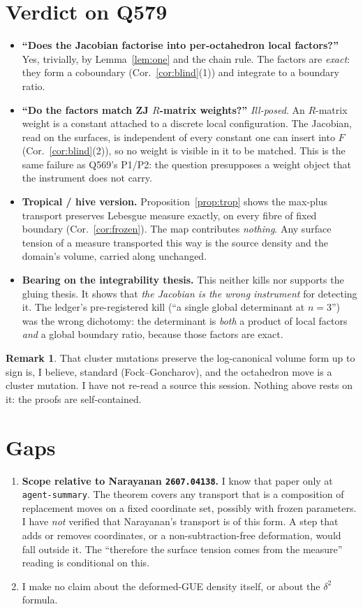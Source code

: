 \documentclass[11pt]{article}
\theoremstyle{definition}
\newtheorem{remark}[theorem]{Remark}
\begin{document}
\section{Verdict on Q579}
\begin{itemize}
\item \textbf{``Does the Jacobian factorise into per-octahedron local factors?''} Yes, trivially, by
Lemma~\ref{lem:one} and the chain rule. The factors are \emph{exact}: they form a coboundary
(Cor.~\ref{cor:blind}(1)) and integrate to a boundary ratio.
\item \textbf{``Do the factors match ZJ $R$-matrix weights?''} \emph{Ill-posed}. An $R$-matrix
weight is a constant attached to a discrete local configuration. The Jacobian, read on the
surfaces, is independent of every constant one can insert into $F$ (Cor.~\ref{cor:blind}(2)), so
no weight is visible in it to be matched. This is the same failure as Q569's P1/P2: the question
presupposes a weight object that the instrument does not carry.
\item \textbf{Tropical / hive version.} Proposition~\ref{prop:trop} shows the max-plus transport
preserves Lebesgue measure exactly, on every fibre of fixed boundary (Cor.~\ref{cor:frozen}). The
map contributes \emph{nothing}. Any surface tension of a measure transported this way is the
source density and the domain's volume, carried along unchanged.
\item \textbf{Bearing on the integrability thesis.} This neither kills nor supports the gluing
thesis. It shows that \emph{the Jacobian is the wrong instrument} for detecting it. The ledger's
pre-registered kill (``a single global determinant at $n=3$'') was the wrong dichotomy: the
determinant is \emph{both} a product of local factors \emph{and} a global boundary ratio, because
those factors are exact.
\end{itemize}

\begin{remark}
That cluster mutations preserve the log-canonical volume form up to sign is, I believe, standard
(Fock--Goncharov), and the octahedron move is a cluster mutation. I have not re-read a source
this session. Nothing above rests on it: the proofs are self-contained.
\end{remark}

\section{Gaps}
\begin{enumerate}
\item \textbf{Scope relative to Narayanan \texttt{2607.04138}.} I know that paper only at
\texttt{agent-summary}. The theorem covers any transport that is a composition of replacement moves
on a fixed coordinate set, possibly with frozen parameters. I have \emph{not} verified that
Narayanan's transport is of this form. A step that adds or removes coordinates, or a
non-subtraction-free deformation, would fall outside it. The ``therefore the surface tension comes
from the measure'' reading is conditional on this.
\item I make no claim about the deformed-GUE density itself, or about the $\delta^2$ formula.
\end{enumerate}
\end{document}
